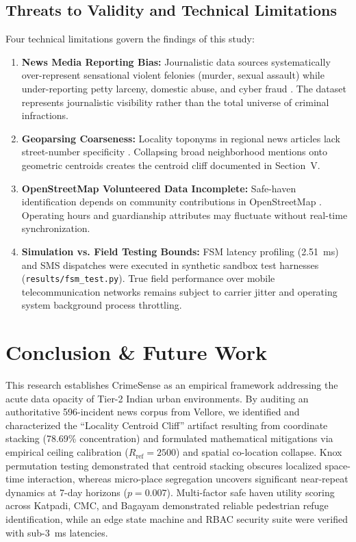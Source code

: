 \documentclass[conference]{IEEEtran}
\begin{document}
\subsection{Threats to Validity and Technical Limitations}
Four technical limitations govern the findings of this study:
\begin{enumerate}
    \item \textbf{News Media Reporting Bias:} Journalistic data sources systematically over-represent sensational violent felonies (murder, sexual assault) while under-reporting petty larceny, domestic abuse, and cyber fraud \cite{earl2004use}. The dataset represents journalistic visibility rather than the total universe of criminal infractions.
    \item \textbf{Geoparsing Coarseness:} Locality toponyms in regional news articles lack street-number specificity \cite{gritta2020pragmatic, zandbergen2009geocoding}. Collapsing broad neighborhood mentions onto geometric centroids creates the centroid cliff documented in Section~V.
    \item \textbf{OpenStreetMap Volunteered Data Incomplete:} Safe-haven identification depends on community contributions in OpenStreetMap \cite{haklay2008openstreetmap}. Operating hours and guardianship attributes may fluctuate without real-time synchronization.
    \item \textbf{Simulation vs. Field Testing Bounds:} FSM latency profiling (2.51~ms) and SMS dispatches were executed in synthetic sandbox test harnesses (\texttt{results/fsm\_test.py}). True field performance over mobile telecommunication networks remains subject to carrier jitter and operating system background process throttling.
\end{enumerate}

\section{Conclusion \& Future Work}
This research establishes CrimeSense as an empirical framework addressing the acute data opacity of Tier-2 Indian urban environments. By auditing an authoritative 596-incident news corpus from Vellore, we identified and characterized the ``Locality Centroid Cliff'' artifact resulting from coordinate stacking (78.69\% concentration) and formulated mathematical mitigations via empirical ceiling calibration ($R_{\text{ref}} = 2500$) and spatial co-location collapse. Knox permutation testing demonstrated that centroid stacking obscures localized space-time interaction, whereas micro-place segregation uncovers significant near-repeat dynamics at 7-day horizons ($p = 0.007$). Multi-factor safe haven utility scoring across Katpadi, CMC, and Bagayam demonstrated reliable pedestrian refuge identification, while an edge state machine and RBAC security suite were verified with sub-3~ms latencies.
\end{document}
